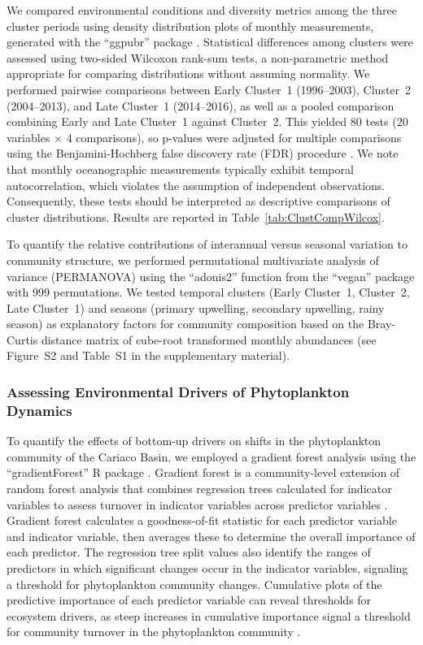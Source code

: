 \documentclass[]{agujournal2019}
\begin{document}
        We compared environmental conditions and diversity metrics among the three cluster periods using density distribution plots of monthly measurements, generated with the ``ggpubr'' package \cite{kassambara_ggpubr_2023}. 
        Statistical differences among clusters were assessed using two-sided Wilcoxon rank-sum tests, a non-parametric method appropriate for comparing distributions without assuming normality. We performed pairwise comparisons between Early Cluster~1 (1996--2003), Cluster~2 (2004--2013), and Late Cluster~1 (2014--2016), as well as a pooled comparison combining Early and Late Cluster~1 against Cluster~2. This yielded 80 tests (20 variables $\times$ 4 comparisons), so p-values were adjusted for multiple comparisons using the Benjamini-Hochberg false discovery rate (FDR) procedure \cite{benjamini_controlling_1995}. We note that monthly oceanographic measurements typically exhibit temporal autocorrelation, which violates the assumption of independent observations. Consequently, these tests should be interpreted as descriptive comparisons of cluster distributions. Results are reported in Table~\ref{tab:ClustCompWilcox}.
        
        To quantify the relative contributions of interannual versus seasonal variation to community structure, we performed permutational multivariate analysis of variance (PERMANOVA) using the ``adonis2'' function from the ``vegan'' package \cite{oksanen_vegan_2024} with 999 permutations. We tested temporal clusters (Early Cluster~1, Cluster~2, Late Cluster~1) and seasons (primary upwelling, secondary upwelling, rainy season) as explanatory factors for community composition based on the Bray-Curtis distance matrix of cube-root transformed monthly abundances (see Figure~S2 and Table~S1 in the supplementary material).


    
    \subsubsection{Assessing Environmental Drivers of Phytoplankton Dynamics}
        To quantify the effects of bottom-up drivers on shifts in the phytoplankton community of the Cariaco Basin, we employed a gradient forest analysis using the ``gradientForest'' R package \cite{ellis_gradient_2012}. Gradient forest is a community-level extension of random forest analysis that combines regression trees calculated for indicator variables to assess turnover in indicator variables across predictor variables \cite{pitcher_example_2012, large_critical_2015, tam_comparing_2017}. Gradient forest calculates a goodness-of-fit statistic for each predictor variable and indicator variable, then averages these to determine the overall importance of each predictor. The regression tree split values also identify the ranges of predictors in which significant changes occur in the indicator variables, signaling a threshold for phytoplankton community changes. Cumulative plots of the predictive importance of each predictor variable can reveal thresholds for ecosystem drivers, as steep increases in cumulative importance signal a threshold for community turnover in the phytoplankton community \cite{tam_comparing_2017}. 
\end{document}
